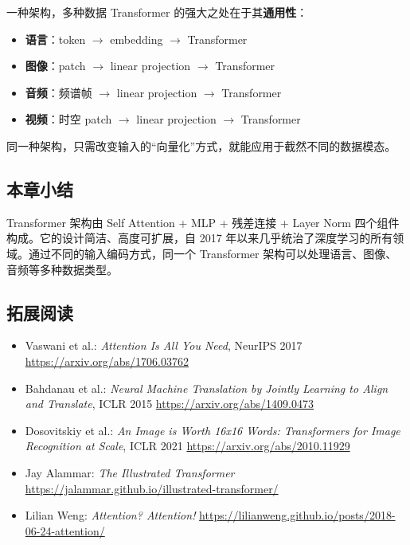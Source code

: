 \begin{importantbox}{一种架构，多种数据}
Transformer 的强大之处在于其\textbf{通用性}：
\begin{itemize}
    \item \textbf{语言}：token $\rightarrow$ embedding $\rightarrow$ Transformer
    \item \textbf{图像}：patch $\rightarrow$ linear projection $\rightarrow$ Transformer
    \item \textbf{音频}：频谱帧 $\rightarrow$ linear projection $\rightarrow$ Transformer
    \item \textbf{视频}：时空 patch $\rightarrow$ linear projection $\rightarrow$ Transformer
\end{itemize}
同一种架构，只需改变输入的``向量化''方式，就能应用于截然不同的数据模态。
\end{importantbox}

\subsection{本章小结}

Transformer 架构由 Self Attention + MLP + 残差连接 + Layer Norm 四个组件构成。它的设计简洁、高度可扩展，自 2017 年以来几乎统治了深度学习的所有领域。通过不同的输入编码方式，同一个 Transformer 架构可以处理语言、图像、音频等多种数据类型。


\subsection{拓展阅读}

\begin{itemize}
    \item Vaswani et al.: \textit{Attention Is All You Need}, NeurIPS 2017 \url{https://arxiv.org/abs/1706.03762}
    \item Bahdanau et al.: \textit{Neural Machine Translation by Jointly Learning to Align and Translate}, ICLR 2015 \url{https://arxiv.org/abs/1409.0473}
    \item Dosovitskiy et al.: \textit{An Image is Worth 16x16 Words: Transformers for Image Recognition at Scale}, ICLR 2021 \url{https://arxiv.org/abs/2010.11929}
    \item Jay Alammar: \textit{The Illustrated Transformer} \url{https://jalammar.github.io/illustrated-transformer/}
    \item Lilian Weng: \textit{Attention? Attention!} \url{https://lilianweng.github.io/posts/2018-06-24-attention/}
\end{itemize}


